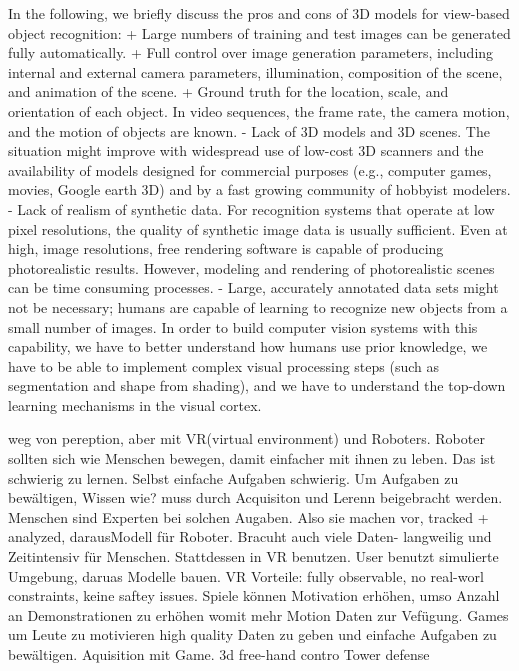 \cite{heisele} \newline
In the following, we briefly discuss the pros and cons of 3D models for view-based object recognition: \newline
+ Large numbers of training and test images can be generated fully automatically.\newline
+ Full control over image generation parameters, including internal and external camera parameters, illumination, composition of the scene, and animation of the scene.\newline
+ Ground truth for the location, scale, and orientation of each object. In video sequences, the frame rate, the camera motion, and the motion of objects are known.\newline
- Lack of 3D models and 3D scenes. The situation might improve with widespread use of low-cost 3D scanners and the availability of models designed for commercial purposes (e.g., computer games, movies, Google earth 3D) and by a fast growing community of hobbyist modelers.\newline
- Lack of realism of synthetic data. For recognition systems that operate at low pixel resolutions, the quality of synthetic image data is usually sufficient. Even at high, image resolutions, free rendering software is capable of producing photorealistic results. However, modeling and rendering of photorealistic scenes can be time consuming processes.\newline
- Large, accurately annotated data sets might not be necessary; humans are capable of learning to recognize new objects from a small number of images. In order to build computer vision systems with this capability, we have to better understand how humans use prior knowledge, we have to be able to implement complex visual processing steps (such as segmentation and shape from shading), and we have to understand the top-down learning mechanisms in the visual cortex.  \par


\cite{imitationLearning1} \newline
weg von pereption, aber mit VR(virtual environment) und Roboters. \newline
Roboter sollten sich wie Menschen bewegen, damit einfacher mit ihnen zu leben. Das ist schwierig zu lernen. Selbst einfache Aufgaben schwierig. Um Aufgaben zu bewältigen, Wissen wie? muss durch Acquisiton und Lerenn beigebracht werden. Menschen sind Experten bei solchen Augaben. Also sie machen vor, tracked + analyzed, darausModell für Roboter. Bracuht auch viele Daten- langweilig und Zeitintensiv für Menschen. \newline
Stattdessen in VR benutzen. User benutzt simulierte Umgebung, daruas Modelle bauen. VR Vorteile: fully observable, no real-worl constraints, keine saftey issues. Spiele können Motivation erhöhen, umso Anzahl an Demonstrationen zu erhöhen womit mehr Motion Daten zur Vefügung. \newline
Games um Leute zu motivieren high quality Daten zu geben und einfache Aufgaben zu bewältigen. Aquisition mit Game. 3d free-hand contro Tower defense \par

